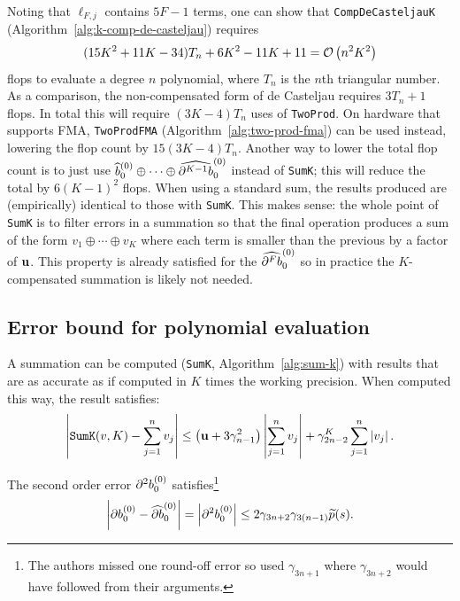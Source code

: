 \noindent Noting that \(\ell_{F, j}\) contains \(5F - 1\) terms, one can
show that \texttt{CompDeCasteljauK} (Algorithm~\ref{alg:k-comp-de-casteljau})
requires
\begin{equation}
(15K^2 + 11K - 34)T_n + 6K^2 - 11K + 11 =
\mathcal{O}\left(n^2 K^2\right)
\end{equation}
flops to evaluate a degree \(n\) polynomial, where \(T_n\) is the
\(n\)th triangular number. As a comparison, the non-compensated form of
de Casteljau requires \(3 T_n + 1\) flops. In total this will require
\((3K - 4)T_n\) uses of \texttt{TwoProd}. On hardware that supports
FMA, \texttt{TwoProdFMA} (Algorithm~\ref{alg:two-prod-fma}) can be used
instead, lowering the flop count by \(15(3K - 4)T_n\). Another way
to lower the total flop count is to just use
\(\widehat{b}_0^{(0)} \oplus \cdots \oplus \cdb{K - 1}_0^{(0)}\)
instead of \texttt{SumK}; this will reduce the total by
\(6(K - 1)^2\) flops. When using a standard sum, the results produced
are (empirically) identical to those with \texttt{SumK}. This makes
sense: the whole point of \texttt{SumK}
is to filter errors in a summation so that the final operation produces
a sum of the form \(v_1 \oplus \cdots \oplus v_K\) where each
term is smaller than the previous by a factor of \(\mathbf{u}\). This
property is already satisfied for the \(\cdb{F}_0^{(0)}\) so in
practice the \(K\)-compensated summation is likely not needed.

\subsection{Error bound for polynomial evaluation}

\begin{theorem}\label{thm:sum-k}
A summation can be computed (\texttt{SumK}, Algorithm~\ref{alg:sum-k})
with results that are as accurate as if computed in \(K\) times the
working precision. When computed this way, the result satisfies:
\begin{equation}
\left|\mathtt{SumK}(v, K) - \sum_{j = 1}^n v_j\right| \leq
\left(\mathbf{u} + 3 \gamma_{n - 1}^2\right) \left|\sum_{j = 1}^n v_j\right| +
\gamma_{2n - 2}^K \sum_{j = 1}^n \left|v_j\right|.
\end{equation}
\end{theorem}

\begin{lemma}\label{lemma:db-lemma}
The second order error \(\db{2}^{(0)}_0\) satisfies\footnote{The authors
  missed one round-off error so used \(\gamma_{3n + 1}\) where
  \(\gamma_{3n + 2}\) would have followed from their arguments.}
\begin{equation}
  \left|\db{1}^{(0)}_0 - \cdb{1}^{(0)}_0\right| =
  \left|\db{2}^{(0)}_0\right| \leq 2 \gamma_{3n + 2} \gamma_{3(n - 1)}
  \widetilde{p}(s).
\end{equation}
\end{lemma}

